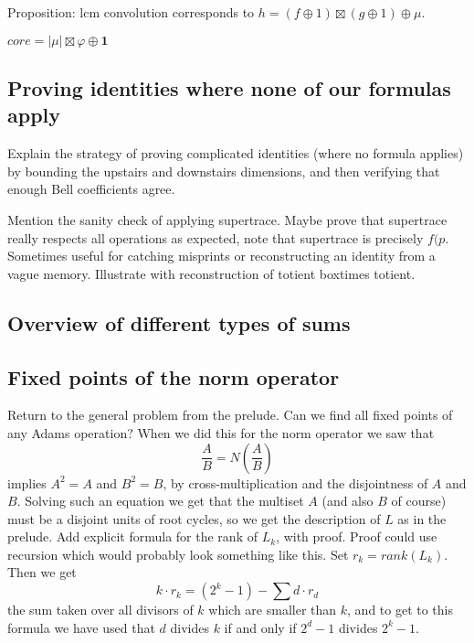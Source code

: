 \documentclass[a4paper]{article}
\begin{document}
Proposition: lcm convolution corresponds to $h = (f \oplus 1) \boxtimes (g \oplus 1) \oplus \mu $.





\begin{example}
$core = \vert \mu \vert \boxtimes \varphi \oplus \mathbf{1}$ 
\end{example}

\subsection{Proving identities where none of our formulas apply}

Explain the strategy of proving complicated identities (where no formula applies) by bounding the upstairs and downstairs dimensions, and then verifying that enough Bell coefficients agree.

Mention the sanity check of applying supertrace. Maybe prove that supertrace really respects all operations as expected, note that supertrace is precisely $f(p$. Sometimes useful for catching misprints or reconstructing an identity from a vague memory. Illustrate with reconstruction of totient boxtimes totient.


\subsection{Overview of different types of sums}



\subsection{Fixed points of the norm operator}

Return to the general problem from the prelude. Can we find all fixed points of any Adams operation? When we did this for the norm operator we saw that 
$$ \frac{A}{B} = N(\frac{A}{B})   $$
implies $A^2 = A$ and $B^2 = B$, by cross-multiplication and the disjointness of $A$ and $B$. Solving such an equation we get that the multiset $A$ (and also $B$ of course) must be a disjoint units of root cycles, so we get the description of $L$ as in the prelude. Add explicit formula for the rank of $L_k$, with proof. Proof could use recursion which would probably look something like this. Set $r_k = rank(L_k)$. Then we get
$$ k \cdot r_k = (2^k-1) - \sum d \cdot r_d    $$
the sum taken over all divisors of $k$ which are smaller than $k$, and to get to this formula we have used that $d$ divides $k$ if and only if $2^d-1$ divides $2^k-1$.
\end{document}
